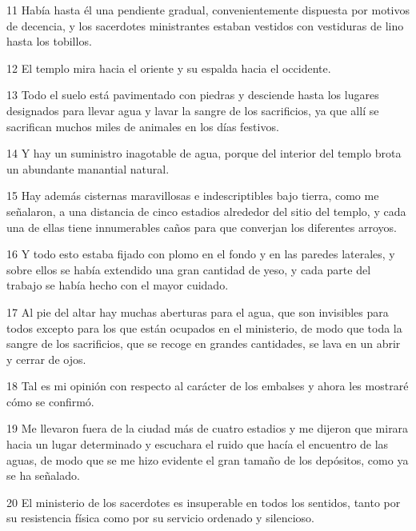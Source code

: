 \par 11 Había hasta él una pendiente gradual, convenientemente dispuesta por motivos de decencia, y los sacerdotes ministrantes estaban vestidos con vestiduras de lino hasta los tobillos.

\par 12 El templo mira hacia el oriente y su espalda hacia el occidente.

\par 13 Todo el suelo está pavimentado con piedras y desciende hasta los lugares designados para llevar agua y lavar la sangre de los sacrificios, ya que allí se sacrifican muchos miles de animales en los días festivos.

\par 14 Y hay un suministro inagotable de agua, porque del interior del templo brota un abundante manantial natural.

\par 15 Hay además cisternas maravillosas e indescriptibles bajo tierra, como me señalaron, a una distancia de cinco estadios alrededor del sitio del templo, y cada una de ellas tiene innumerables caños para que converjan los diferentes arroyos.

\par 16 Y todo esto estaba fijado con plomo en el fondo y en las paredes laterales, y sobre ellos se había extendido una gran cantidad de yeso, y cada parte del trabajo se había hecho con el mayor cuidado.

\par 17 Al pie del altar hay muchas aberturas para el agua, que son invisibles para todos excepto para los que están ocupados en el ministerio, de modo que toda la sangre de los sacrificios, que se recoge en grandes cantidades, se lava en un abrir y cerrar de ojos.

\par 18 Tal es mi opinión con respecto al carácter de los embalses y ahora les mostraré cómo se confirmó.

\par 19 Me llevaron fuera de la ciudad más de cuatro estadios y me dijeron que mirara hacia un lugar determinado y escuchara el ruido que hacía el encuentro de las aguas, de modo que se me hizo evidente el gran tamaño de los depósitos, como ya se ha señalado.

\par 20 El ministerio de los sacerdotes es insuperable en todos los sentidos, tanto por su resistencia física como por su servicio ordenado y silencioso.

